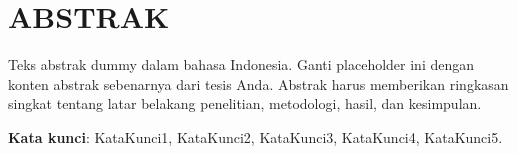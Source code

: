 \chapter*{ABSTRAK}

Teks abstrak dummy dalam bahasa Indonesia. Ganti placeholder ini dengan konten abstrak sebenarnya dari tesis Anda. Abstrak harus memberikan ringkasan singkat tentang latar belakang penelitian, metodologi, hasil, dan kesimpulan.

\vspace{0.3cm}

\noindent
\textbf{Kata kunci}: KataKunci1, KataKunci2, KataKunci3, KataKunci4, KataKunci5.